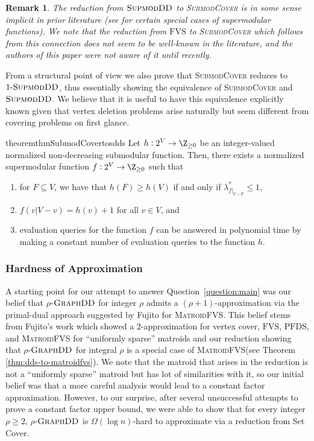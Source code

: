 \documentclass{article}
\newtheorem{remark}{Remark}[section]
\newcommand{\mfvs}{\textsc{MatroidFVS}\xspace}
\newcommand{\dds}{\ensuremath{\textsc{GraphDD}}\xspace}
\newcommand{\pfds}{\ensuremath{\text{PFDS}}\xspace}
\newcommand{\fvs}{\ensuremath{\text{FVS}}\xspace}
\newcommand{\sdds}{\ensuremath{\textsc{SupmodDD}}\xspace}
\newcommand{\rhosdds}[1]{\ensuremath{#1\text{-}\sdds}}
\newcommand{\submodcover}{\textsc{SubmodCover}\xspace}
\begin{document}
\begin{remark}
The reduction from \sdds to \submodcover is in some sense implicit in prior literature (see \cite{Ueno_Kajitani_Gotoh_1988, Fujito-matroid-fvs} for certain special cases of supermodular functions).
We note that the reduction from \fvs to \submodcover which follows from this connection does not seem to be well-known in the literature, and the authors of 
this paper were not aware of it until recently.
\end{remark}


From a structural point of view we
also prove that \submodcover reduces to \rhosdds{1}, thus essentially showing the
equivalence of \submodcover and \sdds. We believe that it is useful to have this equivalence explicitly known given that vertex deletion problems arise naturally but seem different from covering problems on first glance.

\begin{restatable}{theorem}{thmSubmodCovertosdds}\label{thm:SubmodCovertosdds}
Let $h: 2^V\rightarrow \Z_{\ge 0}$ be an integer-valued normalized non-decreasing submodular function. Then, there exists a normalized supermodular function $f:2^V\rightarrow \Z_{\ge 0}$ 
such that 
\begin{enumerate}
    \item for $F\subseteq V$, we have that $h(F)\ge h(V)$ if and only if $\lambda^*_{f|_{V-F}}\le 1$, 
    \item $f(v|V-v) = h(v) + 1$ for all $v \in V$, and 
    \item evaluation queries for the function $f$ can be answered in polynomial time by making a   constant number of evaluation queries to the function $h$. 
\end{enumerate}
\end{restatable}

\subsubsection{Hardness of Approximation}
A starting point for our attempt to answer Question~\ref{question:main} was
our belief that $\rho$-\dds for integer $\rho$ admits a $(\rho+1)$-approximation
via the primal-dual approach suggested by Fujito for \mfvs \cite{Fujito-matroid-fvs}. This belief stems from Fujito's work which showed a $2$-approximation for vertex cover, \fvs, \pfds, and \mfvs for  ``uniformly sparse'' matroids and our reduction showing that $\rho$-\dds for integral $\rho$ is a special case of \mfvs (see Theorem \ref{thm:dds-to-matroidfvs}). We note that the matroid that arises in the reduction is not a ``uniformly sparse'' matroid but has lot of similarities with it, so our initial belief was that a more careful analysis would lead to a constant factor approximation. 
However, to our surprise, after several unsuccessful attempts to prove a constant factor
upper bound, we were able to show that for every integer $\rho \geq 2$,  $\rho$-\dds is $\Omega(\log n)$-hard to approximate via a reduction from Set Cover. 
\end{document}
